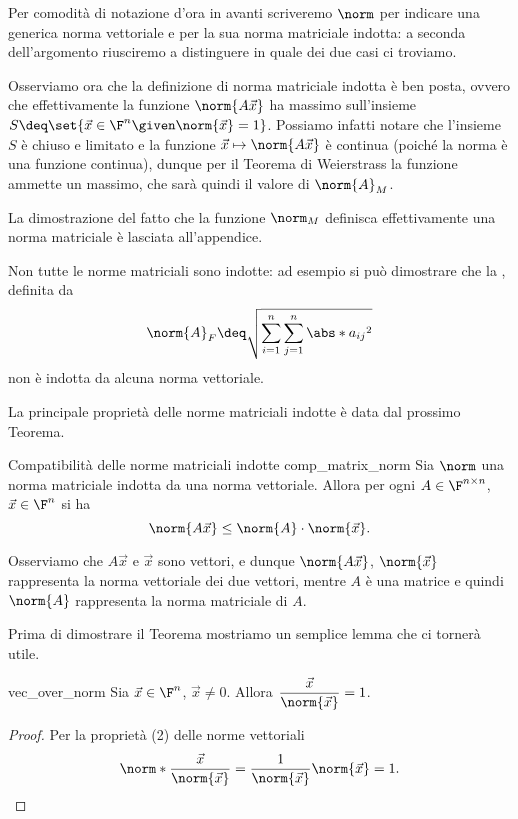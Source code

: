 Per comodità di notazione d'ora in avanti scriveremo $\norm$ per indicare una generica norma vettoriale e per la sua norma matriciale indotta: a seconda dell'argomento riusciremo a distinguere in quale dei due casi ci troviamo.

Osserviamo ora che la definizione di norma matriciale indotta è ben posta, ovvero che effettivamente la funzione $\norm{A\vec x}$ ha massimo sull'insieme $S \deq \set{\vec x \in \F^n \given \norm{\vec x} = 1}$. 
Possiamo infatti notare che l'insieme $S$ è chiuso e limitato e la funzione $\vec x \mapsto \norm{A\vec x}$ è continua (poiché la norma è una funzione continua), dunque per il Teorema di Weierstrass la funzione ammette un massimo, che sarà quindi il valore di $\norm{A}_M$.

La dimostrazione del fatto che la funzione $\norm_M$ definisca effettivamente una norma matriciale è lasciata all'appendice.

\begin{remark}
    Non tutte le norme matriciali sono indotte: ad esempio si può dimostrare che la , definita da \[
        \norm{A}_F \deq \sqrt{\sum_{i=1}^n\sum_{j=1}^n \abs*{a_{ij}}^2}
    \] non è indotta da alcuna norma vettoriale.
\end{remark}

La principale proprietà delle norme matriciali indotte è data dal prossimo Teorema.
\begin{theorem}
    {Compatibilità delle norme matriciali indotte}
    {comp_matrix_norm}
    Sia $\norm$ una norma matriciale indotta da una norma vettoriale. Allora per ogni $A \in \Mat{\F, n, n}$, $\vec x \in \F^n$ si ha \[
        \norm{A\vec x} \leq \norm{A} \cdot \norm{\vec x}.
    \] 
\end{theorem}

Osserviamo che $A\vec x$ e $\vec x$ sono vettori, e dunque $\norm{A\vec x}$, $\norm{\vec x}$ rappresenta la norma vettoriale dei due vettori, mentre $A$ è una matrice e quindi $\norm{A}$ rappresenta la norma matriciale di $A$. 

Prima di dimostrare il Teorema mostriamo un semplice lemma che ci tornerà utile.
\begin{lemma}
    {}{vec_over_norm}
    Sia $\vec x \in \F^n$, $\vec x \neq 0$. Allora $\dfrac{\vec x}{\norm{\vec x}} = 1$.  
\end{lemma}
\begin{proof}
    Per la proprietà (2) delle norme vettoriali \[
        \norm*{\frac{\vec x}{\norm{\vec x}}} = \frac1{\norm{\vec x}} \norm{\vec x} = 1. \qedhere
    \]
\end{proof}


